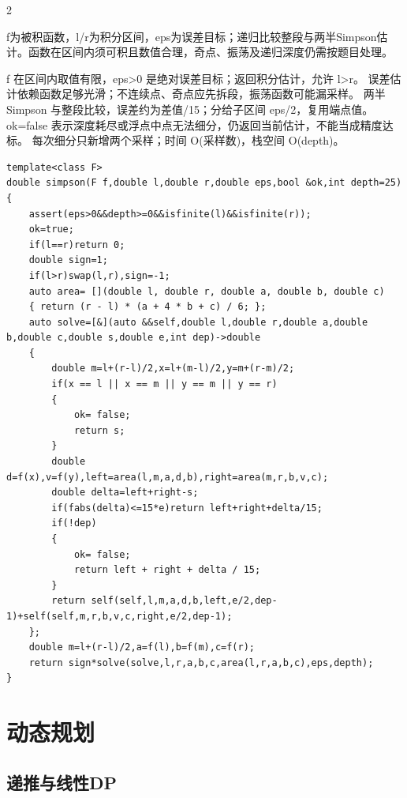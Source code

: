 \documentclass[UTF8,fontset=fandol,a4paper,twoside]{ctexart}
\newcommand{\note}[1]{{\fontsize{10}{12}\selectfont #1\par}}
\begin{document}
\begin{multicols}{2}
\note{f为被积函数，l/\allowbreak{}r为积分区间，eps为误差目标；递归比较整段与两半Simpson估计。函数在区间内须可积且数值合理，奇点、振荡及递归深度仍需按题目处理。}
\note{f 在区间内取值有限，eps>\allowbreak{}0 是绝对误差目标；返回积分估计，允许 l>\allowbreak{}r。 误差估计依赖函数足够光滑；不连续点、奇点应先拆段，振荡函数可能漏采样。 两半 Simpson 与整段比较，误差约为差值/\allowbreak{}15；分给子区间 eps/\allowbreak{}2，复用端点值。 ok=\allowbreak{}false 表示深度耗尽或浮点中点无法细分，仍返回当前估计，不能当成精度达标。 每次细分只新增两个采样；时间 O(\allowbreak{}采样数)\allowbreak{}，栈空间 O(\allowbreak{}depth)\allowbreak{}。}
\begin{lstlisting}
template<class F>
double simpson(F f,double l,double r,double eps,bool &ok,int depth=25)
{
    assert(eps>0&&depth>=0&&isfinite(l)&&isfinite(r));
    ok=true;
    if(l==r)return 0;
    double sign=1;
    if(l>r)swap(l,r),sign=-1;
    auto area= [](double l, double r, double a, double b, double c)
    { return (r - l) * (a + 4 * b + c) / 6; };
    auto solve=[&](auto &&self,double l,double r,double a,double b,double c,double s,double e,int dep)->double
    {
        double m=l+(r-l)/2,x=l+(m-l)/2,y=m+(r-m)/2;
        if(x == l || x == m || y == m || y == r)
        {
            ok= false;
            return s;
        }
        double d=f(x),v=f(y),left=area(l,m,a,d,b),right=area(m,r,b,v,c);
        double delta=left+right-s;
        if(fabs(delta)<=15*e)return left+right+delta/15;
        if(!dep)
        {
            ok= false;
            return left + right + delta / 15;
        }
        return self(self,l,m,a,d,b,left,e/2,dep-1)+self(self,m,r,b,v,c,right,e/2,dep-1);
    };
    double m=l+(r-l)/2,a=f(l),b=f(m),c=f(r);
    return sign*solve(solve,l,r,a,b,c,area(l,r,a,b,c),eps,depth);
}
\end{lstlisting}
\section{动态规划}
\subsection{递推与线性DP}


\end{multicols}
\end{document}
